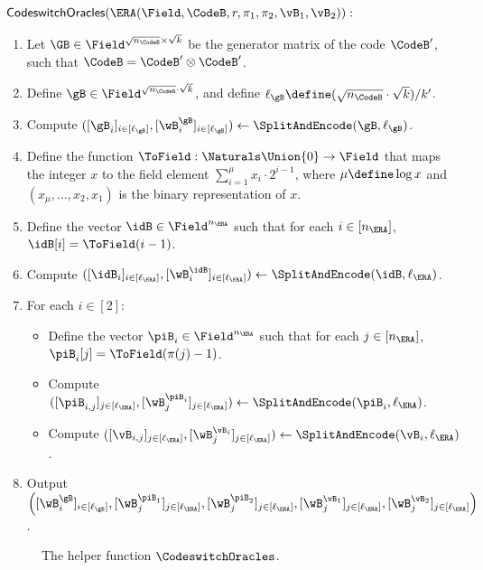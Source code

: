 \begin{tcolorbox}[breakable, enhanced, colback=white, boxrule=0.65pt]
    $\mathsf{CodeswitchOracles}(\ERA(\Field, \CodeB, r, \pi_1, \pi_2, \vB_1, \vB_2)):$
    \begin{enumerate}[nolistsep]
        \item Let $\GB \in \Field^{\sqrt{n_{\CodeB}} \times \sqrt{k}}$ be the generator matrix of the code $\CodeB'$, such that $\CodeB = \CodeB' \otimes \CodeB'$. 
        \item Define $\gB \in \Field^{\sqrt{n_{\CodeB}} \cdot \sqrt{k}}$, and define $\ell_{\gB} \define (\sqrt{n_{\CodeB}} \cdot \sqrt{k})/ k'$.
        \item Compute $([\gB_i]_{i \in [\ell_{\gB}]}, [\wB^{\gB}_i]_{i \in [\ell_{\gB}]}) \gets \SplitAndEncode(\gB, \ell_{\gB})$.
        \item Define the function $\ToField : \Naturals \Union \{0\} \to \Field$ that maps the integer $x$ to the field element $\sum_{i = 1}^{\mu} x_i \cdot 2^{i-1}$, where $\mu \define \log x$ and $(x_{\mu}, \dotsc, x_2,x_1)$ is the binary representation of $x$.
        \item Define the vector $\idB \in \Field^{n_{\ERA}}$ such that for each $i \in [n_{\ERA}]$, $\idB[i] = \ToField(i-1)$.
        \item Compute $([\idB_i]_{i \in [\ell_{\ERA}]}, [\wB^{\idB}_i]_{i \in [\ell_{\ERA}]}) \gets \SplitAndEncode(\idB, \ell_{\ERA})$.
        \item For each $i \in [2]$:
        \begin{itemize}[nolistsep]
            \item Define the vector $\piB_i \in \Field^{n_{\ERA}}$ such that for each $j \in [n_{\ERA}]$, $\piB_i[j] = \ToField(\pi(j) - 1)$.
            \item Compute $([\piB_{i,j}]_{j \in [\ell_{\ERA}]}, [\wB^{\piB_i}_j]_{j \in [\ell_{\ERA}]}) \gets \SplitAndEncode(\piB_i, \ell_{\ERA})$.
            \item Compute $([\vB_{i,j}]_{j \in [\ell_{\ERA}]}, [\wB^{\vB_i}_j]_{j \in [\ell_{\ERA}]}) \gets \SplitAndEncode(\vB_i, \ell_{\ERA})$.
        \end{itemize}
        \item Output $\left ( [\wB^{\gB}_i]_{i \in [\ell_{\gB}]}, [\wB^{\piB_1}_j]_{j \in [\ell_{\ERA}]}, [\wB^{\piB_2}_j]_{j \in [\ell_{\ERA}]}, [\wB^{\vB_1}_j]_{j \in [\ell_{\ERA}]}, [\wB^{\vB_2}_j]_{j \in [\ell_{\ERA}]} \right )$.
    \end{enumerate}
\end{tcolorbox}
\begin{figure}[htbp]
\caption{The helper function $\CodeswitchOracles$.}
\label{fig:codeswitch-oracles}
\end{figure}
